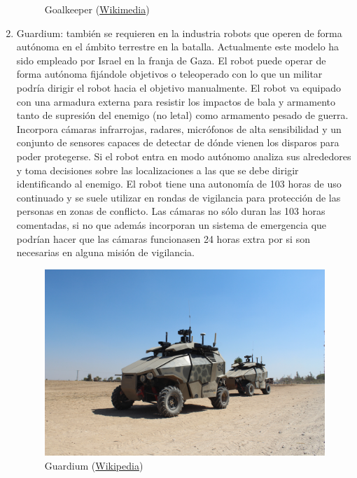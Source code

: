 \begin{enumerate}
\begin{figure}[!h]
  	\caption{Goalkeeper (\href{https://commons.wikimedia.org/wiki/File:Goalkeeper.jpg}{Wikimedia})}
  	\label{fig:goalkeeper}
  \end{figure}
  \item Guardium: también se requieren en la industria robots que operen de forma autónoma en el ámbito terrestre en la batalla. Actualmente este modelo ha sido empleado por Israel en la franja de Gaza. El robot puede operar de forma autónoma fijándole objetivos o teleoperado con lo que un militar podría dirigir el robot hacia el objetivo manualmente. El robot va equipado con una armadura externa para resistir los impactos de bala y armamento tanto de supresión del enemigo (no letal) como armamento pesado de guerra. Incorpora cámaras infrarrojas, radares, micrófonos de alta sensibilidad y un conjunto de sensores capaces de detectar de dónde vienen los disparos para poder protegerse. Si el robot entra en modo autónomo analiza sus alrededores y toma decisiones sobre las localizaciones a las que se debe dirigir identificando al enemigo. El robot tiene una autonomía de 103 horas de uso continuado y se suele utilizar en rondas de vigilancia para protección de las personas en zonas de conflicto. Las cámaras no sólo duran las 103 horas comentadas, si no que además incorporan un sistema de emergencia que podrían hacer que las cámaras funcionasen 24 horas extra por si son necesarias en alguna misión de vigilancia.
  \begin{figure}[!h]
  	\centering
  	\includegraphics[scale=0.13]{./EtapaModerna/Imagenes/guardium.jpg}
  	\caption{Guardium (\href{https://ca.wikipedia.org/wiki/Fitxer:Flickr_-_Israel_Defense_Forces_-_Israeli_Made_Guardium_UGV_(5).jpg}{Wikipedia})}
  	\label{fig:guardium}
  \end{figure}

\end{enumerate}
